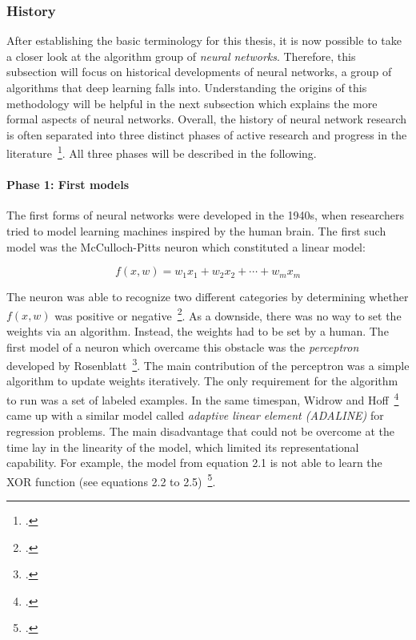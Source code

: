 \subsubsection{History}
\label{sub:dl_history}

After establishing the basic terminology for this thesis, 
it is now possible to take a closer look at the algorithm group of 
\textit{neural networks}. Therefore, this subsection will focus on historical
developments of neural networks, a group of algorithms that deep learning falls
into.
Understanding the origins of this methodology will be helpful in the next 
subsection which explains the more formal aspects of neural networks.
Overall, the history of neural network research is often separated into three
distinct phases of active research and progress in the literature~\footcite{Goodfellow2016}.
All three phases will be described in the following.

\paragraph{Phase 1: First models}

The first forms of neural networks were developed in the 1940s, when
researchers tried to model learning machines inspired by the human brain.
The first such model was the McCulloch-Pitts neuron which constituted a linear
model:

\begin{equation}
  f (x, w) = w_1 x_1 + w_2 x_2 + \cdots + w_m x_m
\end{equation}

The neuron was able to recognize two different categories by determining
whether $f(x, w)$ was positive or negative~\footcite{McCulloch1943}.
As a downside, there was no way to set the weights via an algorithm.
Instead, the weights had to be set by a human.
The first model of a neuron which overcame this obstacle was the \textit{perceptron}
developed by Rosenblatt~\footcite{Rosenblatt1958}. The main contribution of the
perceptron was a simple algorithm to update weights iteratively.
The only requirement for the algorithm to run was a set of labeled examples.
In the same timespan, Widrow and Hoff~\footcite{Widrow1960} came up with a similar
model called \textit{adaptive linear element (ADALINE)} for regression problems.
The main disadvantage that could not be overcome at the time lay in the 
linearity of the model, which limited its representational capability.
For example, the model from equation 2.1 is not able to learn the XOR function 
(see equations 2.2 to 2.5)~\footcite{Minsky1969}.

